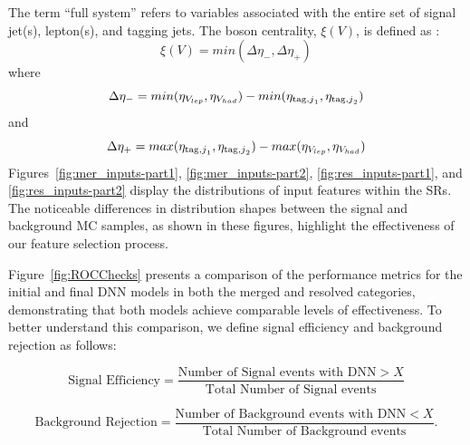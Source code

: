 The term ``full system'' refers to variables associated with the entire set of signal jet(s), lepton(s), and tagging jets.
The boson centrality, $\xi(V)$, is defined as :  
\begin{equation} \label{eq:centr} \xi(V)  = min(\Delta\eta_{-},\Delta\eta_{+}) \end{equation} where $$\Delta\eta_{-} = min(\eta_{V_{lep} },\eta_{V_{had} }) - min(\eta_{{\mathrm{tag}, j}_1},\eta_{{\mathrm{tag}, j}_2})$$ and  $$\Delta\eta_{+} = max(\eta_{{\mathrm{tag}, j}_1},\eta_{{\mathrm{tag}, j}_2}) - max(\eta_{V_{lep} },\eta_{V_{had} }) $$
Figures~\ref{fig:mer_inputs-part1}, \ref{fig:mer_inputs-part2}, \ref{fig:res_inputs-part1}, and \ref{fig:res_inputs-part2} display the distributions of input features within the SRs. The noticeable differences in distribution shapes between the signal and background MC samples, as shown in these figures, highlight the effectiveness of our feature selection process.

Figure~\ref{fig:ROCChecks} presents a comparison of the performance metrics for the initial and final DNN models in both the merged and resolved categories, demonstrating that both models achieve comparable levels of effectiveness. To better understand this comparison, 
we define signal efficiency and background rejection as follows:

\begin{equation}
\text{Signal Efficiency} = \frac{\text{Number of Signal events with DNN} > X}{\text{Total Number of Signal events}}
\end{equation}

\begin{equation}
\text{Background Rejection} = \frac{\text{Number of Background events with DNN} < X}{\text{Total Number of Background events}}.
\end{equation}

